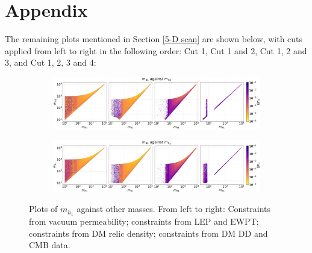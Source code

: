 \documentclass[12pt]{article}
\begin{document}
\section{Appendix}
\label{sec:Appendix}
The remaining plots mentioned in Section \ref{5-D scan} are shown below, with cuts applied from left to right in the following order: Cut 1, Cut 1 and 2, Cut 1, 2 and 3, and Cut 1, 2, 3 and 4:
\begin{figure}[H]
    \begin{subfigure}[b]{\columnwidth}
      \centering
      \includegraphics[width=1\columnwidth]{4plot/MD1_MD2.pdf}
    \end{subfigure}

    \begin{subfigure}[b]{\columnwidth}
      \centering
      \includegraphics[width=1\columnwidth]{4plot/MD1_MDP.pdf}
    \end{subfigure}
    \caption{Plots of $m_{h_1}$ against other masses. From left to right: Constraints from vacuum permeability; constraints from LEP and EWPT; constraints from DM relic density; constraints from DM DD and CMB data.}
\end{figure}
\end{document}

